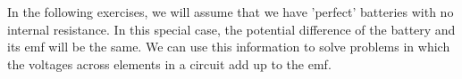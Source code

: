         \label{m38772*id64677}In the following exercises, we will assume that we have 'perfect' batteries with no internal resistance. In this special case, the potential difference of the battery and its emf will be the same. We can use this information to solve problems in which the voltages across elements in a circuit add up to the emf.\par 
        \label{m38772*id64681}\nopagebreak\noindent{}
    
        
\par
            \label{m38772*secfhsst!!!underscore!!!id616}\vspace{.5cm} 
      

